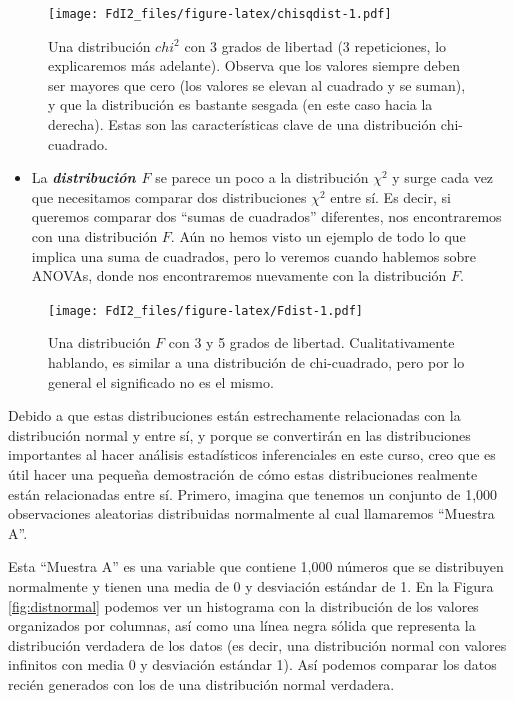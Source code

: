 \documentclass[spanish,]{book}
\providecommand{\tightlist}{%
  \setlength{\itemsep}{0pt}\setlength{\parskip}{0pt}}
\begin{document}
\begin{figure}
\centering
\texttt{[image: FdI2\_files/figure-latex/chisqdist-1.pdf]}
\caption{\label{fig:chisqdist}Una distribución \(chi^2\) con 3 grados de
libertad (3 repeticiones, lo explicaremos más adelante). Observa que los
valores siempre deben ser mayores que cero (los valores se elevan al
cuadrado y se suman), y que la distribución es bastante sesgada (en este
caso hacia la derecha). Estas son las características clave de una
distribución chi-cuadrado.}
\end{figure}

\begin{itemize}
\tightlist
\item
  La \textbf{\emph{distribución \(F\)}} se parece un poco a la
  distribución \(\chi^2\) y surge cada vez que necesitamos comparar dos
  distribuciones \(\chi^2\) entre sí. Es decir, si queremos comparar dos
  ``sumas de cuadrados'' diferentes, nos encontraremos con una
  distribución \(F\). Aún no hemos visto un ejemplo de todo lo que
  implica una suma de cuadrados, pero lo veremos cuando hablemos sobre
  ANOVAs, donde nos encontraremos nuevamente con la distribución \(F\).
\end{itemize}

\begin{figure}
\centering
\texttt{[image: FdI2\_files/figure-latex/Fdist-1.pdf]}
\caption{\label{fig:Fdist}Una distribución \(F\) con 3 y 5 grados de
libertad. Cualitativamente hablando, es similar a una distribución de
chi-cuadrado, pero por lo general el significado no es el mismo.}
\end{figure}

Debido a que estas distribuciones están estrechamente relacionadas con
la distribución normal y entre sí, y porque se convertirán en las
distribuciones importantes al hacer análisis estadísticos inferenciales
en este curso, creo que es útil hacer una pequeña demostración de cómo
estas distribuciones realmente están relacionadas entre sí. Primero,
imagina que tenemos un conjunto de 1,000 observaciones aleatorias
distribuidas normalmente al cual llamaremos ``Muestra A''.

Esta ``Muestra A'' es una variable que contiene 1,000 números que se
distribuyen normalmente y tienen una media de 0 y desviación estándar de
1. En la Figura \ref{fig:distnormal} podemos ver un histograma con la
distribución de los valores organizados por columnas, así como una línea
negra sólida que representa la distribución verdadera de los datos (es
decir, una distribución normal con valores infinitos con media 0 y
desviación estándar 1). Así podemos comparar los datos recién generados
con los de una distribución normal verdadera.
\end{document}
